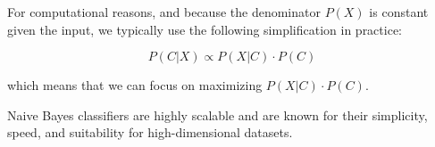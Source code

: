 For computational reasons, and because the denominator $P(X)$ is constant given the input, we typically use the following simplification in practice:

\begin{equation*}
P(C|X) \propto P(X|C) \cdot P(C)
\end{equation*}

which means that we can focus on maximizing $P(X|C) \cdot P(C)$.

Naive Bayes classifiers are highly scalable and are known for their simplicity, speed, and suitability for high-dimensional datasets.